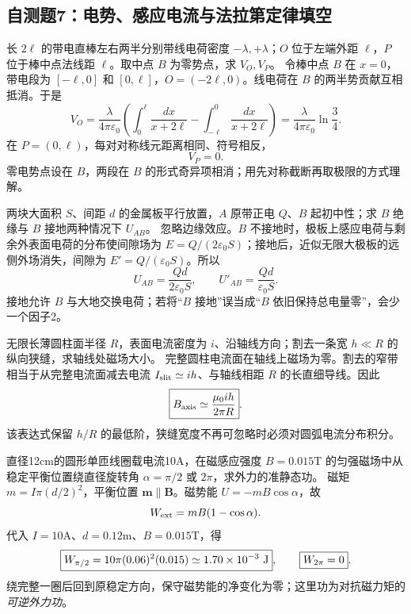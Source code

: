 \subsection{自测题7：电势、感应电流与法拉第定律填空}

\problemtext 长 $2\ell$ 的带电直棒左右两半分别带线电荷密度 $-\lambda,+\lambda$；$O$ 位于左端外距 $\ell$，$P$ 位于棒中点法线距 $\ell$。取中点 $B$ 为零势点，求 $V_O,V_P$。
\workings 令棒中点 $B$ 在 $x=0$，带电段为 $[-\ell,0]$ 和 $[0,\ell]$，$O=(-2\ell,0)$。线电荷在 $B$ 的两半势贡献互相抵消。于是
\[
V_O=\frac{\lambda}{4\pi\varepsilon_0}\left(
\int_0^\ell\frac{dx}{x+2\ell}-
\int_{-\ell}^0\frac{dx}{x+2\ell}\right)
=\boxed{\frac{\lambda}{4\pi\varepsilon_0}\ln\frac34}.
\]
在 $P=(0,\ell)$，每对对称线元距离相同、符号相反，
\[\boxed{V_P=0}.\]
\crosscheck 零电势点设在 $B$，两段在 $B$ 的形式奇异项相消；用先对称截断再取极限的方式理解。

\problemtext 两块大面积 $S$、间距 $d$ 的金属板平行放置，$A$ 原带正电 $Q$、$B$ 起初中性；求 $B$ 绝缘与 $B$ 接地两种情况下 $U_{AB}$。
\workings 忽略边缘效应。$B$ 不接地时，极板上感应电荷与剩余外表面电荷的分布使间隙场为 $E=Q/(2\varepsilon_0S)$；接地后，近似无限大极板的远侧外场消失，间隙为 $E'=Q/(\varepsilon_0S)$。所以
\[
\boxed{U_{AB}=\frac{Qd}{2\varepsilon_0S}},\qquad
\boxed{U'_{AB}=\frac{Qd}{\varepsilon_0S}}.
\]
\crosscheck 接地允许 $B$ 与大地交换电荷；若将“$B$ 接地”误当成“$B$ 依旧保持总电量零”，会少一个因子2。

\problemtext 无限长薄圆柱面半径 $R$，表面电流密度为 $i$、沿轴线方向；割去一条宽 $h\ll R$ 的纵向狭缝，求轴线处磁场大小。
\workings 完整圆柱电流面在轴线上磁场为零。割去的窄带相当于从完整电流面减去电流 $I_{\rm slit}\simeq ih$、与轴线相距 $R$ 的长直细导线。因此
\[\boxed{B_{\rm axis}\simeq \frac{\mu_0 i h}{2\pi R}}.\]
\crosscheck 该表达式保留 $h/R$ 的最低阶，狭缝宽度不再可忽略时必须对圆弧电流分布积分。

\problemtext 直径12cm的圆形单匝线圈载电流10A，在磁感应强度 $B=0.015$T 的匀强磁场中从稳定平衡位置绕直径旋转角 $\alpha=\pi/2$ 或 $2\pi$，求外力的准静态功。
\workings 磁矩 $m=I\pi(d/2)^2$，平衡位置 $\bm m\parallel\bm B$。磁势能 $U=-mB\cos\alpha$，故
\[W_{\rm ext}=mB(1-\cos\alpha).\]
代入 $I=10$A、$d=0.12$m、$B=0.015$T，得
\[
\boxed{W_{\pi/2}=10\pi(0.06)^2(0.015)\simeq1.70\times10^{-3}\ {\rm J}},
\qquad\boxed{W_{2\pi}=0}.
\]
\crosscheck 绕完整一圈后回到原稳定方向，保守磁势能的净变化为零；这里功为对抗磁力矩的\emph{可逆外力功}。

